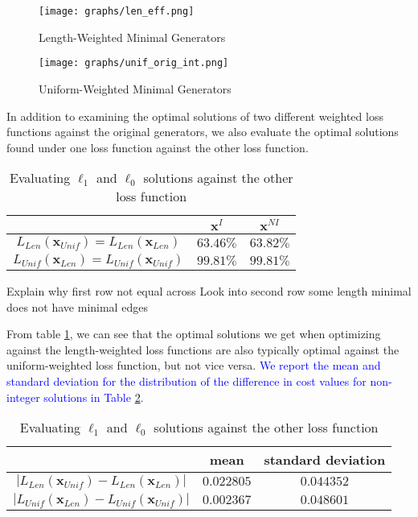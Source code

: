 \documentclass[11pt]{article}
\newcommand{\x}[0]{\mathbf{x}}
\begin{document}
\begin{figure}[H]
  \centering
  \begin{minipage}[b]{0.45\textwidth}
    \texttt{[image: graphs/len\_eff.png]}
    \caption{Length-Weighted Minimal Generators}
  \end{minipage}
  \hfill
  \begin{minipage}[b]{0.45\textwidth}
    \texttt{[image: graphs/unif\_orig\_int.png]}
    \caption{Uniform-Weighted Minimal Generators}
  \end{minipage}
\end{figure}

In addition to examining the optimal solutions of two different weighted loss functions against the original generators, we also evaluate the optimal solutions  found under one loss function against the other loss function. 

\begin{table}[H]
    \centering
    \begin{tabular}{|c|c|c|}
    \hline
         & $\x^I$ & $\x^{NI}$ \\ \hline
         $L_{Len}(\x_{Unif}) = L_{Len}(\x_{Len})$ & $63.46\%$  & $63.82\%$ \\ \hline
         $L_{Unif}(\x_{Len}) = L_{Unif}(\x_{Unif})$ & $99.81\%$ & $99.81\%$ \\ \hline
    \end{tabular}
    \caption{Evaluating $\ell_1$ and $\ell_0$ solutions against the other loss function}
    \label{table:optimalboth}
\end{table}
Explain why first row not equal across
Look into second row some length minimal does not have minimal edges 

From table \ref{table:optimalboth}, we can see that the optimal solutions we get when optimizing against the length-weighted loss functions are also typically optimal against the uniform-weighted loss function, but not vice versa. \textcolor{blue}{We report the mean and standard deviation for the distribution of the difference in cost values for non-integer solutions in Table \ref{table:stats}.}

\begin{table}[H]
    \centering
    \begin{tabular}{|c|c|c|}
    \hline
         & mean & standard deviation \\ \hline
         $|L_{Len}(\x_{Unif}) - L_{Len}(\x_{Len})|$ & $0.022805$  & $0.044352$ \\ \hline
         $|L_{Unif}(\x_{Len}) - L_{Unif}(\x_{Unif})|$ & $0.002367$ & $0.048601$ \\ \hline
    \end{tabular}
    \caption{Evaluating $\ell_1$ and $\ell_0$ solutions against the other loss function}
    \label{table:stats}
\end{table}
\end{document}
